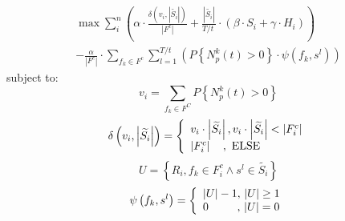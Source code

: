 \documentclass[conference,compsoc]{IEEEtran}
\begin{document}
\begin{equation}
\begin{split}
\max \sum\limits_{i}^{n}{(\alpha \cdot \frac{\delta ({{v}_{i}},\left| \widetilde{{{S}_{i}}} \right|)}{\left| {{F}^{c}} \right|}+\frac{\left| \widetilde{{{S}_{i}}} \right|}{{T}/{t}\;}\cdot (\beta \cdot {{S}_{i}}+\gamma \cdot {{H}_{i}}))}  \\
-\frac{\alpha }{\left| {{F}^{c}} \right|}\cdot \sum\limits_{{{f}_{k}}\in {{F}^{c}}}{\sum\limits_{l=1}^{{T}/{t}\;}{\left( P\left\{ N_{p}^{k}\left( t \right)>0 \right\}\cdot \psi \left( {{f}_{k}},{{s}^{l}} \right) \right)}}
\end{split}
\end{equation}
subject to:
\begin{equation}
{v_i} = \sum\limits_{{f_k} \in {F^C}} {P\left\{ {N_p^k\left( t \right) > 0} \right\}}
\end{equation}
\begin{equation}
\delta \left( {{v_i},\left| {\widetilde {{S_i}}} \right|} \right) = \left\{ \begin{array}{l}
{v_i} \cdot \left| {\widetilde {{S_i}}} \right|,{\rm{    }}{v_i} \cdot \left| {\widetilde {{S_i}}} \right| < \left| {F_i^c} \right|\\
\left| {F_i^c} \right|{\rm{   }}\quad,\ {\rm{    ELSE}}
\end{array} \right.
\end{equation}
\begin{equation}
U = \left\{ {{R_i},{f_k} \in F_i^c \wedge {s^l} \in \widetilde {{S_i}}} \right\}
\end{equation}
\begin{equation}
\psi \left( {{f_k},{s^l}} \right) = \left\{ \begin{array}{l}
\left| U \right| - 1,{\rm{    }}\left| U \right| \ge 1\\
{\rm{   }}0\quad \quad \; \; ,\, \left| U \right| = 0
\end{array} \right.
\end{equation}
\end{document}
